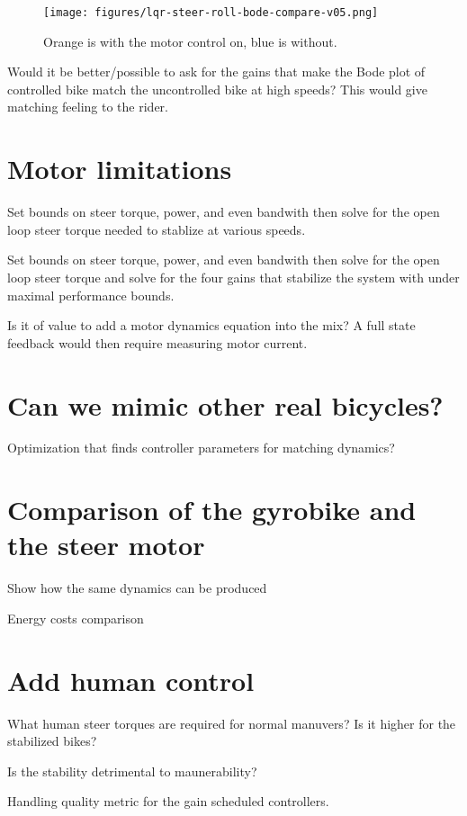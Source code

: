 \documentclass[12pt]{article}
\begin{document}
\begin{figure}
  \centering
  \texttt{[image: figures/lqr-steer-roll-bode-compare-v05.png]}
  \caption{Orange is with the motor control on, blue is without.}
  \label{fig:lqr-steer-roll-bode-compare}
\end{figure}

Would it be better/possible to ask for the gains that make the Bode plot of
controlled bike match the uncontrolled bike at high speeds? This would give
matching feeling to the rider.

\section{Motor limitations}

Set bounds on steer torque, power, and even bandwith then solve for the open
loop steer torque needed to stablize at various speeds.

Set bounds on steer torque, power, and even bandwith then solve for the open
loop steer torque and solve for the four gains that stabilize the system with
under maximal performance bounds.

Is it of value to add a motor dynamics equation into the mix? A full state
feedback would then require measuring motor current.

\section{Can we mimic other real bicycles?}

Optimization that finds controller parameters for matching dynamics?

\section{Comparison of the gyrobike and the steer motor}

Show how the same dynamics can be produced

Energy costs comparison

\section{Add human control}

What human steer torques are required for normal manuvers? Is it higher for the
stabilized bikes?

Is the stability detrimental to maunerability?

Handling quality metric for the gain scheduled controllers.
\end{document}
